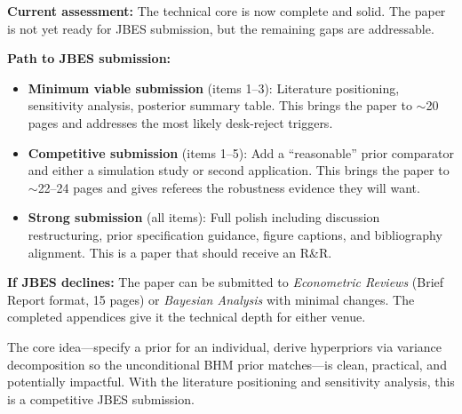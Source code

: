 \documentclass[12pt,a4paper]{article}
\begin{document}
\textbf{Current assessment:} The technical core is now complete and solid.  The
paper is not yet ready for JBES submission, but the remaining gaps are
addressable.

\textbf{Path to JBES submission:}
\begin{itemize}[leftmargin=1.5em]
\item \textbf{Minimum viable submission} (items 1--3): Literature positioning,
sensitivity analysis, posterior summary table.  This brings the paper to
${\sim}$20 pages and addresses the most likely desk-reject triggers.

\item \textbf{Competitive submission} (items 1--5): Add a ``reasonable'' prior
comparator and either a simulation study or second application.  This brings
the paper to ${\sim}$22--24 pages and gives referees the robustness evidence
they will want.

\item \textbf{Strong submission} (all items): Full polish including discussion
restructuring, prior specification guidance, figure captions, and bibliography
alignment.  This is a paper that should receive an R\&R.
\end{itemize}

\textbf{If JBES declines:} The paper can be submitted to \textit{Econometric
Reviews} (Brief Report format, 15 pages) or \textit{Bayesian Analysis} with
minimal changes.  The completed appendices give it the technical depth for
either venue.

The core idea---specify a prior for an individual, derive hyperpriors via
variance decomposition so the unconditional BHM prior matches---is clean,
practical, and potentially impactful.  With the literature positioning and
sensitivity analysis, this is a competitive JBES submission.
\end{document}
